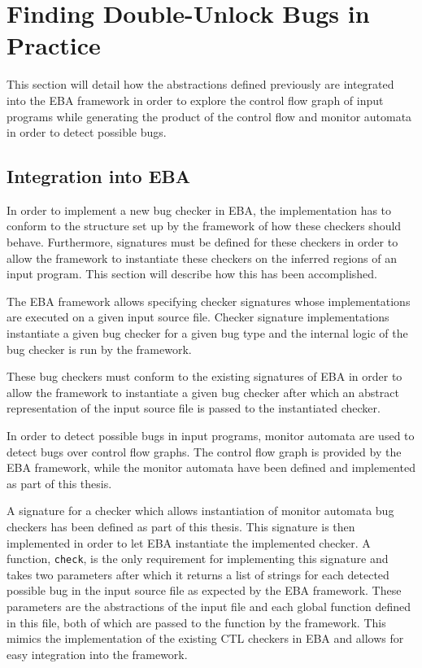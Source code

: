 \section{Finding Double-Unlock Bugs in Practice}
This section will detail how the abstractions defined previously are integrated into the EBA framework in order to explore the control flow graph of input programs while generating the product of the control flow and monitor automata in order to detect possible bugs. 

\subsection{Integration into EBA}
In order to implement a new bug checker in EBA, the implementation has to conform to the structure set up by the framework of how these checkers should behave. Furthermore, signatures must be defined for these checkers in order to allow the framework to instantiate these checkers on the inferred regions of an input program. This section will describe how this has been accomplished.  

\newpar The EBA framework allows specifying checker signatures whose implementations are executed on a given input source file. Checker signature implementations instantiate a given bug checker for a given bug type and the internal logic of the bug checker is run by the framework. 

\newpar These bug checkers must conform to the existing signatures of EBA in order to allow the framework to instantiate a given bug checker after which an abstract representation of the input source file is passed to the instantiated checker. 

\newpar In order to detect possible bugs in input programs, monitor automata are used to detect bugs over control flow graphs. The control flow graph is provided by the EBA framework, while the monitor automata have been defined and implemented as part of this thesis. 

\newpar A signature for a checker which allows instantiation of monitor automata bug checkers has been defined as part of this thesis. This signature is then implemented in order to let EBA instantiate the implemented checker. A function, \texttt{check}, is the only requirement for implementing this signature and takes two parameters after which it returns a list of strings for each detected possible bug in the input source file as expected by the EBA framework. These parameters are the abstractions of the input file and each global function defined in this file, both of which are passed to the function by the framework. This mimics the implementation of the existing CTL checkers in EBA and allows for easy integration into the framework. 

